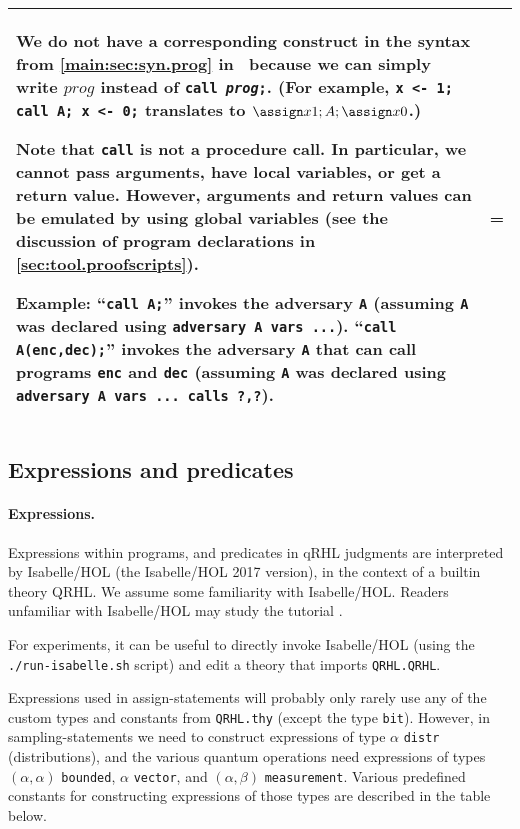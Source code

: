 \documentclass{article}
\newcommand\qrhlautoref[1]{\autoref*{main:#1} in~\cite{qrhl-paper-from-manual}}
\begin{document}
\begin{longtable}{|p{.275\hsize}|>{\parskip=\medskipamount}p{.66\hsize}|}
  We do not have a corresponding construct in the syntax from
  \qrhlautoref{sec:syn.prog} because we can simply write $\mathit{prog}$
  instead of \texttt{call \textit{prog};}. (For example, \texttt{x <-
    1; call A; x <- 0;} translates to $\assign x1;A;\assign x0$.)

  Note that \texttt{call} is not a procedure call. In particular, we
  cannot pass arguments, have local variables, or get a return
  value. However, arguments and return values can be emulated
  by using global variables (see the discussion of program
  declarations in \autoref{sec:tool.proofscripts}).

  \textbf{Example:} ``\texttt{call A;}'' invokes the adversary \texttt{A}
  (assuming \texttt{A} was declared using \texttt{adversary A vars
    ...}).  ``\texttt{call A(enc,dec);}'' invokes the adversary \texttt{A}
  that can call programs \texttt{enc} and \texttt{dec}
  (assuming \texttt{A} was declared using \texttt{adversary A vars
    ... calls ?,?}).
  \\
  \hline
\end{longtable}



\subsection{Expressions and predicates}
\label{sec:tool.pred}

\newcommand\tooltype[1]{\index{#1@\textttOLD{#1} (Isabelle/HOL type)}}

\paragraph{Expressions.}
Expressions within programs, and predicates in qRHL judgments are
interpreted by Isabelle/HOL (the Isabelle/HOL 2017 version), in the
context of a builtin theory QRHL. We assume some familiarity with
Isabelle/HOL. Readers unfamiliar with Isabelle/HOL may study the
tutorial \cite{isabelle-tutorial}.

For experiments, it can be useful to directly invoke Isabelle/HOL
(using the \texttt{./run-isabelle.sh} script) and edit a theory that
imports \texttt{QRHL.QRHL}.

Expressions used in assign-statements will probably only rarely use
any of the custom types and constants from \texttt{QRHL.thy} (except the type
\texttt{bit}). However, in sampling-statements we need to construct
expressions of type $\alpha$
\texttt{distr} (distributions), and the various quantum operations
need expressions of types $(\alpha,\alpha)$
\texttt{bounded}, $\alpha$
\texttt{vector}, and $(\alpha,\beta)$
\texttt{measurement}. Various predefined constants for constructing
expressions of those types are described in the table below.
\end{document}

